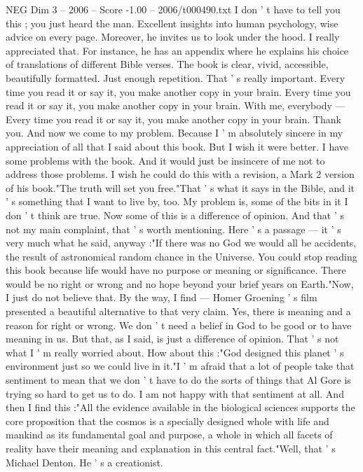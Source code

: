 \begin{textsample}{NEG Dim 3 – 2006 – Score -1.00 – 2006/t000490.txt}
I don ' t have to tell you this ; you just heard the man.
Excellent insights into human psychology, wise advice on every page.
Moreover, he invites us to look under the hood.
I really appreciated that.
For instance, he has an appendix where he explains his choice of translations of different Bible verses.
The book is clear, vivid, accessible, beautifully formatted.
Just enough repetition.
That ' s really important.
Every time you read it or say it, you make another copy in your brain.
Every time you read it or say it, you make another copy in your brain.
With me, everybody — Every time you read it or say it, you make another copy in your brain.
Thank you.
And now we come to my problem.
Because I ' m absolutely sincere in my appreciation of all that I said about this book.
But I wish it were better.
I have some problems with the book.
And it would just be insincere of me not to address those problems.
I wish he could do this with a revision, a Mark 2 version of his book."The truth will set you free."That ' s what it says in the Bible, and it ' s something that I want to live by, too.
My problem is, some of the bits in it I don ' t think are true.
Now some of this is a difference of opinion.
And that ' s not my main complaint, that ' s worth mentioning.
Here ' s a passage — it ' s very much what he said, anyway :"If there was no God we would all be accidents, the result of astronomical random chance in the Universe.
You could stop reading this book because life would have no purpose or meaning or significance.
There would be no right or wrong and no hope beyond your brief years on Earth."Now, I just do not believe that.
By the way, I find — Homer Groening ' s film presented a beautiful alternative to that very claim.
Yes, there is meaning and a reason for right or wrong.
We don ' t need a belief in God to be good or to have meaning in us.
But that, as I said, is just a difference of opinion.
That ' s not what I ' m really worried about.
How about this :"God designed this planet ' s environment just so we could live in it."I ' m afraid that a lot of people take that sentiment to mean that we don ' t have to do the sorts of things that Al Gore is trying so hard to get us to do.
I am not happy with that sentiment at all.
And then I find this :"All the evidence available in the biological sciences supports the core proposition that the cosmos is a specially designed whole with life and mankind as its fundamental goal and purpose, a whole in which all facets of reality have their meaning and explanation in this central fact."Well, that ' s Michael Denton.
He ' s a creationist.

\end{textsample}
